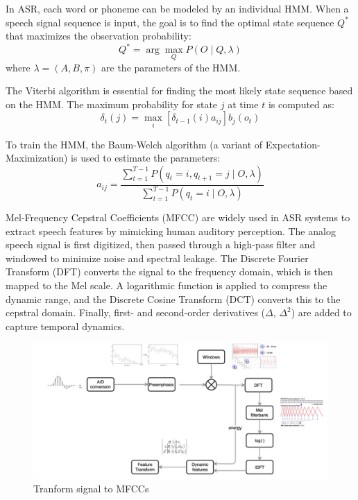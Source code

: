\documentclass[conference]{IEEEtran}
\begin{document}
In ASR, each word or phoneme can be modeled by an individual HMM. When a speech signal sequence is input, the goal is to find the optimal state sequence $Q^*$ that maximizes the observation probability:
\begin{equation}
    Q^* = \arg\max_Q P(O \mid Q, \lambda)
\end{equation}
where $\lambda = (A, B, \pi)$ are the parameters of the HMM.

The Viterbi algorithm is essential for finding the most likely state sequence based on the HMM. The maximum probability for state $j$ at time $t$ is computed as:
\begin{equation}
    \delta_t(j) = \max_i \left[ \delta_{t-1}(i) a_{ij} \right] b_j(o_t)
\end{equation}

To train the HMM, the Baum-Welch algorithm (a variant of Expectation-Maximization) is used to estimate the parameters:
\begin{equation}
    a_{ij} = \frac{\sum_{t=1}^{T-1} P(q_t = i, q_{t+1} = j \mid O, \lambda)}{\sum_{t=1}^{T-1} P(q_t = i \mid O, \lambda)}
\end{equation}

Mel-Frequency Cepstral Coefficients (MFCC) are widely used in ASR systems to extract speech features by mimicking human auditory perception. The analog speech signal is first digitized, then passed through a high-pass filter and windowed to minimize noise and spectral leakage. The Discrete Fourier Transform (DFT) converts the signal to the frequency domain, which is then mapped to the Mel scale. A logarithmic function is applied to compress the dynamic range, and the Discrete Cosine Transform (DCT) converts this to the cepstral domain. Finally, first- and second-order derivatives ($\Delta$, $\Delta^2$) are added to capture temporal dynamics.

\begin{figure}[H]
    \centering
    \begin{minipage}{0.45\textwidth}
        \centering
        \includegraphics[width=1\textwidth]{resource/img/mfcc_flow.pdf}
        \caption{Tranform signal to MFCCs}
        \label{fig:LSTM}
    \end{minipage}
\end{figure}
\end{document}
